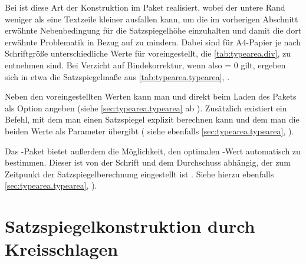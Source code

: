 \begin{Explain}
  Bei {\KOMAScript} ist diese Art der Konstruktion im Paket 
  realisiert, wobei der untere Rand weniger als eine Textzeile kleiner
  ausfallen kann, um die im vorherigen Abschnitt erwähnte Nebenbedingung für
  die Satzspiegelhöhe einzuhalten und damit die dort erwähnte Problematik in
  Bezug auf  zu mindern. Dabei sind für
  A4-Papier je nach Schriftgröße unterschiedliche Werte für 
  voreingestellt, die \autoref{tab:typearea.div},
   zu entnehmen sind. Bei Verzicht auf
  Bindekorrektur, wenn also  = 0 gilt, ergeben sich in etwa
  die Satzspiegelmaße aus \autoref{tab:typearea.typearea},
  .

  Neben den voreingestellten Werten kann man  und  direkt
  beim Laden des Pakets als Option angeben (siehe
  \autoref{sec:typearea.typearea} ab
  ). Zusätzlich existiert ein Befehl, mit
  dem man einen Satzspiegel explizit berechnen kann und dem man die beiden
  Werte als Parameter übergibt (\iftrue%
  siehe ebenfalls
  \autoref{sec:typearea.typearea}, \fi{}).

  Das -Paket bietet außerdem die Möglichkeit, den optimalen
  -Wert automatisch zu bestimmen. Dieser ist von der Schrift und dem
  Durchschuss abhängig, der zum Zeitpunkt der Satzspiegelberechnung
  eingestellt ist%
  \iftrue%
  . Siehe hierzu ebenfalls \autoref{sec:typearea.typearea}, \else\
  (\fi{}\iftrue)\fi.%
\end{Explain}%


\section{Satzspiegelkonstruktion durch Kreisschlagen}

